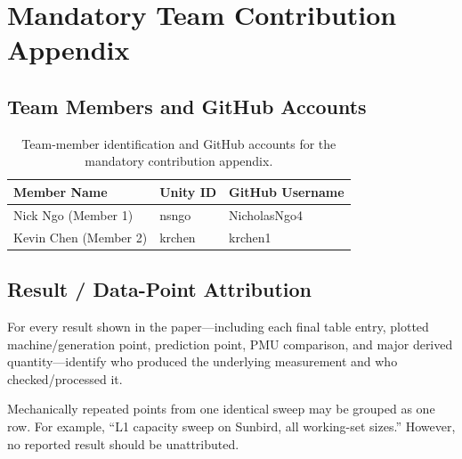 \documentclass{article}
\begin{document}
\setcounter{subsection}{0}
\renewcommand{\thesubsection}{\Alph{subsection}}

\section{Mandatory Team Contribution Appendix}

\subsection{Team Members and GitHub Accounts}

\begin{table}[htbp]
\centering
\caption{Team-member identification and GitHub accounts for the mandatory contribution appendix.}
\label{tab:team-members}

\begin{tabular}{|p{4cm}|p{4cm}|p{5cm}|}
\hline
\textbf{Member Name} &
\textbf{Unity ID} &
\textbf{GitHub Username} \\
\hline

Nick Ngo (Member 1) &
nsngo &
NicholasNgo4 \\
\hline

Kevin Chen (Member 2) &
krchen &
krchen1 \\
\hline

\end{tabular}

\end{table}


\subsection{Result / Data-Point Attribution}

For every result shown in the paper---including each final table entry, plotted machine/generation point, prediction point, PMU comparison, and major derived quantity---identify who produced the underlying measurement and who checked/processed it.

Mechanically repeated points from one identical sweep may be grouped as one row. For example, ``L1 capacity sweep on Sunbird, all working-set sizes.'' However, no reported result should be unattributed.
\end{document}
